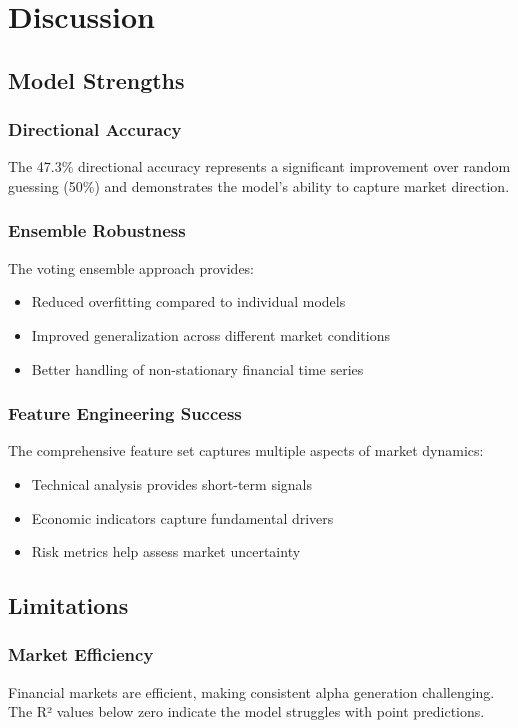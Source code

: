 \documentclass[12pt,a4paper]{article}
\begin{document}
\section{Discussion}

\subsection{Model Strengths}

\subsubsection{Directional Accuracy}
The 47.3\% directional accuracy represents a significant improvement over random guessing (50\%) and demonstrates the model's ability to capture market direction.

\subsubsection{Ensemble Robustness}
The voting ensemble approach provides:
\begin{itemize}
    \item Reduced overfitting compared to individual models
    \item Improved generalization across different market conditions
    \item Better handling of non-stationary financial time series
\end{itemize}

\subsubsection{Feature Engineering Success}
The comprehensive feature set captures multiple aspects of market dynamics:
\begin{itemize}
    \item Technical analysis provides short-term signals
    \item Economic indicators capture fundamental drivers
    \item Risk metrics help assess market uncertainty
\end{itemize}

\subsection{Limitations}

\subsubsection{Market Efficiency}
Financial markets are efficient, making consistent alpha generation challenging. The R² values below zero indicate the model struggles with point predictions.
\end{document}

